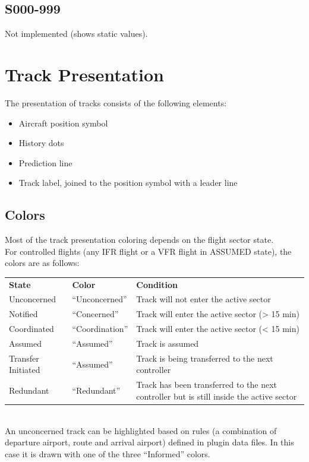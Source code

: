 \documentclass[11pt,a4paper,oldfontcommands]{memoir}
\begin{document}
\subsection{S000-999}
Not implemented (shows static values).\\

\section{Track Presentation}
The presentation of tracks consists of the following elements:
\begin{itemize}
\item{Aircraft position symbol}
\item{History dots}
\item{Prediction line}
\item{Track label, joined to the position symbol with a leader line}
\end{itemize}

\subsection{Colors}
Most of the track presentation coloring depends on the flight sector state.
\\For controlled flights (any IFR flight or a VFR flight in ASSUMED state), the colors are as follows:\\
\begin{tabular}{p{5cm}p{5cm}p{5cm}}
\textbf{State}          & \textbf{Color}    & \textbf{Condition}
\\Unconcerned           & “Unconcerned”     & Track will not enter the active sector
\\Notified              & “Concerned”       & Track will enter the active sector (> 15 min)
\\Coordinated           & “Coordination”    & Track will enter the active sector (< 15 min)
\\Assumed               & “Assumed”         & Track is assumed
\\Transfer Initiated    & “Assumed”         & Track is being transferred to the next controller
\\Redundant             & “Redundant”       & Track has been transferred to the next controller but is still inside the active sector
\end{tabular}\\

An unconcerned track can be highlighted based on rules (a combination of departure airport, route and
arrival airport) defined in plugin data files. In this case it is drawn with one of the three “Informed” colors.\\
\end{document}
